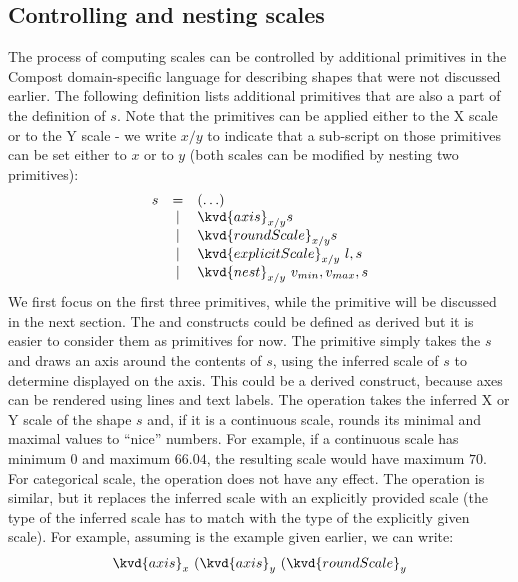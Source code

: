 \documentclass{jfp}
\begin{document}
{\subsection*{Controlling and nesting scales}
The process of computing scales can be controlled by additional primitives in the Compost
domain-specific language for describing shapes that were not discussed earlier. The following
definition lists additional primitives that are also a part of the definition of $s$. Note that
the primitives can be applied either to the X scale or to the Y scale - we write $x/y$ to indicate
that a sub-script on those primitives can be set either to $x$ or to $y$ (both scales can be
modified by nesting two primitives):
%
\begin{equation*}
\begin{array}{rcl}
s & = & (\ldots)\\
 & | & \kvd{axis}_{x/y} s\\
 & | & \kvd{roundScale}_{x/y} s\\
 & | & \kvd{explicitScale}_{x/y}~l, s\\
 & | & \kvd{nest}_{x/y}~v_{min}, v_{max}, s
\end{array}
\end{equation*}
%
We first focus on the first three primitives, while the  primitive will be discussed in
the next section. The  and  constructs could be defined as derived %
but it is easier to consider them as primitives for now. The  primitive simply takes the %
$s$ and draws an axis around the contents of $s$, using the inferred scale of $s$ to determine %
displayed on the axis. This could be a derived construct, because axes can be rendered using lines
and text labels.
The  operation takes the inferred X or Y scale of the shape $s$ and, if it is a
continuous scale, rounds its minimal and maximal values to ``nice'' numbers. For example, if a
continuous scale has minimum $\num{0}$ and maximum $\num{66.04}$, the resulting scale would have
maximum $\num{70}$. For categorical scale, the operation does not have any effect.
The  operation is similar, but it replaces the inferred scale with an explicitly
provided scale (the type of the inferred scale has to match with the type of the explicitly given
scale). For example, assuming  is the example given earlier, we can write:
%
\begin{equation*}
\begin{array}{l}
\kvd{axis}_x~(\kvd{axis}_y~(\kvd{roundScale}_y\\

\end{array}
\end{equation*}}
\end{document}
